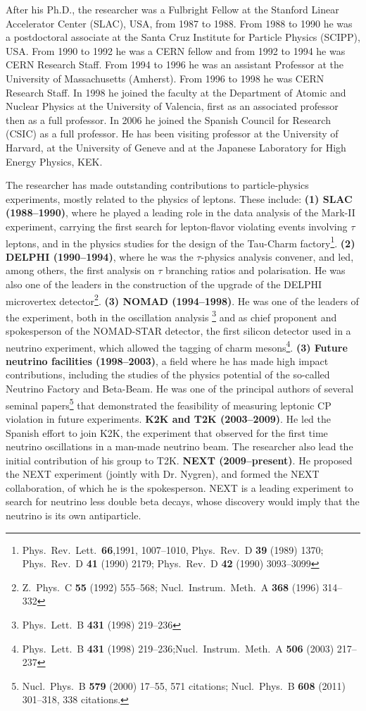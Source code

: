 After his Ph.D., the researcher was a Fulbright Fellow at the Stanford Linear Accelerator Center (SLAC), USA, from 1987 to 1988. From 1988 to 1990 he was a postdoctoral associate at the Santa Cruz Institute for Particle Physics (SCIPP), USA. From 1990 to 1992 he was a CERN fellow and from 1992 to 1994 he was CERN Research Staff. From 1994 to 1996 he was an assistant Professor at the University of Massachusetts (Amherst). From 1996 to 1998 he was CERN Research Staff. In 1998 he joined the faculty at the Department of Atomic and Nuclear Physics at the University of Valencia, first as an associated professor then as a full professor. In 2006 he joined the Spanish Council for Research (CSIC) as a full professor. He has been visiting professor at the University of Harvard, at the University of Geneve and at the Japanese Laboratory for High Energy Physics, KEK. 

The researcher has made outstanding contributions to particle-physics experiments, mostly related to the physics of leptons. These include:
%
{\bf (1) SLAC (1988--1990)}, where he played a leading role in the data analysis of the Mark-II experiment, carrying the first search for lepton-flavor violating events involving $\tau$ leptons, and in the physics studies for the design of the Tau-Charm factory\footnote{Phys.\ Rev.\ Lett.\ {\bf66},1991, 1007--1010, Phys.\ Rev.\ D {\bf39} (1989) 1370; Phys.\ Rev.\ D {\bf41} (1990) 2179; Phys.\ Rev.\ D {\bf42} (1990) 3093--3099}. 
{\bf (2) DELPHI (1990--1994)}, where he was the $\tau$-physics analysis convener, and led, among others, the first analysis on $\tau$ branching ratios and polarisation. He was also one of the leaders in the construction of the upgrade of the DELPHI microvertex detector\footnote{Z.\ Phys.\ C {\bf55} (1992) 555--568; Nucl.\ Instrum.\ Meth.\ A {\bf368} (1996) 314--332}. 
{\bf (3) NOMAD (1994--1998)}.  He was one of the leaders of the experiment, both in the oscillation analysis \footnote{Phys.\ Lett.\ B {\bf431} (1998) 219--236} and as chief proponent and spokesperson of the NOMAD-STAR detector, the first silicon detector used in a neutrino experiment, which allowed the tagging of charm mesons\footnote{Phys.\ Lett.\ B {\bf431} (1998) 219--236;Nucl.\ Instrum.\ Meth.\ A {\bf506} (2003) 217--237}.
{\bf (3) Future neutrino facilities (1998--2003)}, a field where he has made 
high impact contributions, including the studies of the physics potential of the so-called Neutrino Factory and Beta-Beam. He was one of the principal authors of several seminal papers\footnote{Nucl.\ Phys.\ B {\bf579} (2000) 17--55, 571 citations; Nucl.\ Phys.\ B {\bf608} (2011) 301--318, 338 citations.} that demonstrated the feasibility of measuring leptonic CP violation in future experiments. 
{\bf K2K and T2K (2003--2009)}.  He led the Spanish effort to join K2K, the experiment that observed for the first time neutrino oscillations in a man-made neutrino beam.  The researcher also lead the initial contribution of his group to T2K.
{\bf NEXT (2009--present)}. He proposed the NEXT experiment (jointly with Dr. Nygren), and formed the NEXT collaboration, of which he is the spokesperson. NEXT is a leading experiment to search for neutrino less double beta decays, whose discovery would imply that the neutrino is its own antiparticle. 
